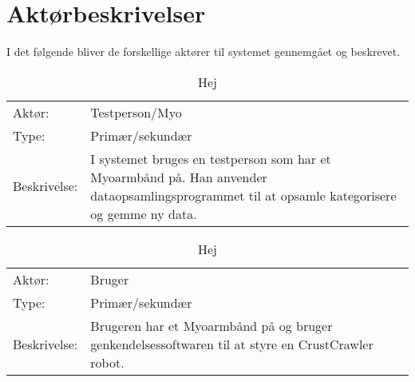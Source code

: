 \thispagestyle{fancy}
\chapter{Aktørbeskrivelser}
\label{chp:aktorbeskrivelser}
I det følgende bliver de forskellige aktører til systemet gennemgået og beskrevet.
\bgroup
\def\arraystretch{1.8}
\begin{center}
	\begin{table}[htbp]
		\begin{tabular}{lp{10cm}}
			\rowcolor{grey} Aktør:		& Testperson/Myo \\
			Type: 	& Primær/sekundær \\
			Beskrivelse:				& I systemet bruges en testperson som har et Myoarmbånd på. Han anvender dataopsamlingsprogrammet til at opsamle kategorisere og gemme ny data.
		\end{tabular}
		\caption{Hej}
	\end{table}
\end{center}

\begin{center}
	\begin{table}[htbp]
		\begin{tabular}{lp{10cm}}
			\rowcolor{grey} Aktør:		& Bruger \\
			Type: 	& Primær/sekundær \\
			Beskrivelse:				& Brugeren har et Myoarmbånd på og bruger genkendelsessoftwaren til at styre en CrustCrawler robot.
		\end{tabular}
		\caption{Hej}
	\end{table}
\end{center}
\egroup